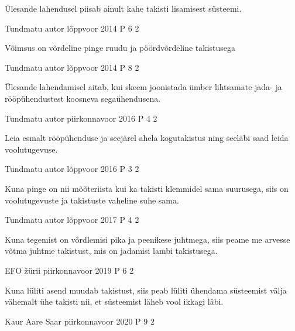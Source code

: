 \documentclass[11pt]{article}
\begin{document}
{{\ifHint
Ülesande lahendusel piisab ainult kahe takisti lisamisest süsteemi.
\fi
}

{Tundmatu autor} %
{lõppvoor} %
{2014} %
{P 6} %
{2} %
{

\ifHint
Võimsus on võrdeline pinge ruudu ja pöördvõrdeline takistusega
\fi
}

{Tundmatu autor} %
{lõppvoor} %
{2014} %
{P 8} %
{2} %
{

\ifHint
Ülesande lahendamisel aitab, kui skeem joonistada ümber lihtsamate jada- ja rööpühendustest koosneva segaühendusena.
\fi
}


{Tundmatu autor} %
{piirkonnavoor} %
{2016} %
{P 4} %
{2} %
{

\ifHint
Leia esmalt rööpühenduse ja seejärel ahela kogutakistus ning seeläbi saad leida voolutugevuse.
\fi
}


{Tundmatu autor} %
{lõppvoor} %
{2016} %
{P 3} %
{2} %
{

\ifHint
Kuna pinge on nii mõõteriista kui ka takisti klemmidel sama suurusega, siis on voolutugevuste ja takistuste vaheline suhe sama.
\fi
}

{Tundmatu autor} %
{lõppvoor} %
{2017} %
{P 4} %
{2} %
{

\ifHint
Kuna tegemist on võrdlemisi pika ja peenikese juhtmega, siis peame me arvesse võtma juhtme takistust, mis on jadamisi lambi takistusega.
\fi
}

{EFO žürii} %
{piirkonnavoor} %
{2019} %
{P 6} %
{2} %
{

\ifHint
Kuna lüliti asend muudab takistust, siis peab lüliti ühendama süsteemist välja vähemalt ühe takisti nii, et süsteemist läheb vool ikkagi läbi.
\fi
}

{Kaur Aare Saar} %
{piirkonnavoor} %
{2020} %
{P 9} %
{2} %
{

}}
\end{document}
